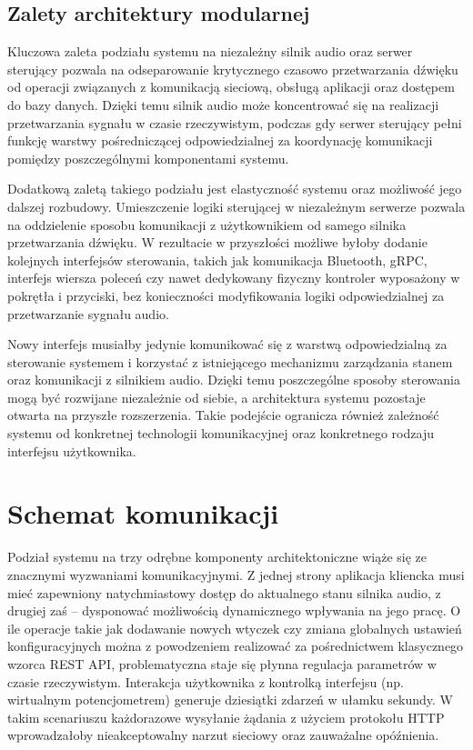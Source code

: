 \documentclass[12pt,a4paper]{report}
\begin{document}
\subsection{Zalety architektury modularnej}
Kluczowa zaleta podziału systemu na niezależny silnik audio oraz
serwer sterujący pozwala na odseparowanie krytycznego czasowo
przetwarzania dźwięku od operacji związanych z komunikacją sieciową,
obsługą aplikacji oraz dostępem do bazy danych. Dzięki temu silnik
audio może koncentrować się na realizacji przetwarzania sygnału w
czasie rzeczywistym, podczas gdy serwer sterujący pełni funkcję
warstwy pośredniczącej odpowiedzialnej za koordynację komunikacji
pomiędzy poszczególnymi komponentami systemu.

Dodatkową zaletą takiego podziału jest elastyczność systemu oraz
możliwość jego dalszej rozbudowy. Umieszczenie logiki sterującej w
niezależnym serwerze pozwala na oddzielenie sposobu komunikacji z
użytkownikiem od samego silnika przetwarzania dźwięku. W rezultacie w
przyszłości możliwe byłoby dodanie kolejnych interfejsów sterowania,
takich jak komunikacja Bluetooth, gRPC, interfejs wiersza poleceń czy
nawet dedykowany fizyczny kontroler wyposażony w pokrętła i
przyciski, bez konieczności modyfikowania logiki odpowiedzialnej za
przetwarzanie sygnału audio.

Nowy interfejs musiałby jedynie komunikować się z warstwą
odpowiedzialną za sterowanie systemem i korzystać z istniejącego
mechanizmu zarządzania stanem oraz komunikacji z silnikiem audio.
Dzięki temu poszczególne sposoby sterowania mogą być rozwijane
niezależnie od siebie, a architektura systemu pozostaje otwarta na
przyszłe rozszerzenia. Takie podejście ogranicza również zależność
systemu od konkretnej technologii komunikacyjnej oraz konkretnego
rodzaju interfejsu użytkownika.

\section{Schemat komunikacji}
Podział systemu na trzy odrębne komponenty architektoniczne wiąże się
ze znacznymi wyzwaniami komunikacyjnymi. Z jednej strony aplikacja
kliencka musi mieć zapewniony natychmiastowy dostęp do aktualnego
stanu silnika audio, z drugiej zaś – dysponować możliwością
dynamicznego wpływania na jego pracę. O ile operacje takie jak
dodawanie nowych wtyczek czy zmiana globalnych ustawień
konfiguracyjnych można z powodzeniem realizować za pośrednictwem
klasycznego wzorca REST API, problematyczna staje się płynna
regulacja parametrów w czasie rzeczywistym. Interakcja użytkownika z
kontrolką interfejsu (np. wirtualnym potencjometrem) generuje
dziesiątki zdarzeń w ułamku sekundy. W takim scenariuszu każdorazowe
wysyłanie żądania z użyciem protokołu HTTP wprowadzałoby
nieakceptowalny narzut sieciowy oraz zauważalne opóźnienia.
\end{document}
